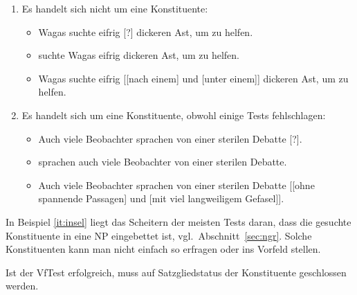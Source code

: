\begin{enumerate}
  \item Es handelt sich nicht um eine Konstituente:
    \begin{itemize}\Lf
      \item \PronTest \Ast Wagas suchte eifrig [?] dickeren Ast, um zu helfen.
      \item \VfTest {} suchte Wagas eifrig dickeren Ast, um zu helfen.
      \item \KoorTest \Ast Wagas suchte eifrig [[nach einem] und [unter einem]] dickeren Ast, um zu helfen.
    \end{itemize}
  \item\label{it:insel} Es handelt sich um eine Konstituente, obwohl einige Tests fehlschlagen:
    \begin{itemize}\Lf
      \item \PronTest \Ast Auch viele Beobachter sprachen von einer sterilen Debatte [?].
      \item \VfTest {} sprachen auch viele Beobachter von einer sterilen Debatte.
      \item \KoorTest Auch viele Beobachter sprachen von einer sterilen Debatte [[ohne spannende Passagen] und [mit viel langweiligem Gefasel]].
    \end{itemize}
\end{enumerate}

In Beispiel \ref{it:insel} liegt das Scheitern der meisten Tests daran, dass die gesuchte Konstituente in eine NP eingebettet ist, vgl.\ Abschnitt~\ref{sec:ngr}.
Solche Konstituenten kann man nicht einfach so erfragen oder ins Vorfeld stellen.


Ist der VfTest erfolgreich, muss auf Satzgliedstatus der Konstituente geschlossen werden.

